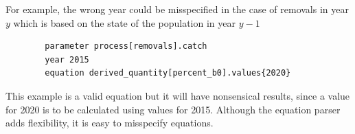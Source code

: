 For example, the wrong year could be misspecified in the case of removals in year $y$ which is based on the state of the population in year $y-1$

{\small{\begin{verbatim}
		parameter process[removals].catch
		year 2015
		equation derived_quantity[percent_b0].values{2020}
		\end{verbatim}}}

This example is a valid equation but it will have nonsensical results, since a value for 2020 is to be calculated using values for 2015. Although the equation parser adds flexibility, it is easy to misspecify equations.
